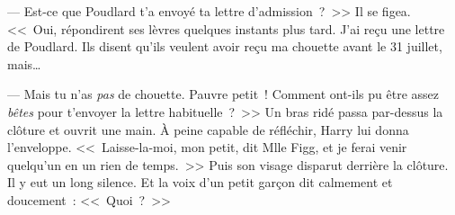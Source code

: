 --- Est-ce que Poudlard t'a envoyé ta lettre d'admission~?~>>
Il se figea.
<<~Oui, répondirent ses lèvres quelques instants plus tard. J'ai reçu une lettre de Poudlard. Ils disent qu'ils veulent avoir reçu ma chouette avant le 31 juillet, mais…

--- Mais tu n'as \emph{pas} de chouette. Pauvre petit~! Comment ont-ils pu être assez \emph{bêtes} pour t'envoyer la lettre habituelle~?~>>
Un bras ridé passa par-dessus la clôture et ouvrit une main. À peine capable de réfléchir, Harry lui donna l'enveloppe.
<<~Laisse-la-moi, mon petit, dit Mlle Figg, et je ferai venir quelqu'un en un rien de temps.~>>
Puis son visage disparut derrière la clôture.
Il y eut un long silence.
Et la voix d'un petit garçon dit calmement et doucement~: <<~Quoi~?~>>
